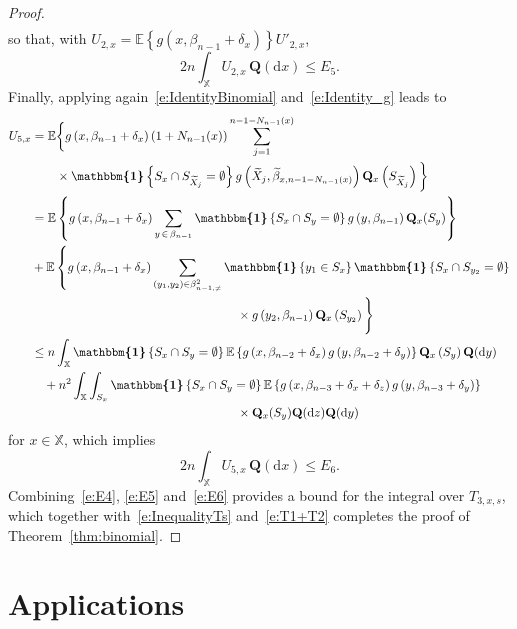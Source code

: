\documentclass[AHL,Unicode,longabstracts]{cedram}
\newcommand{\bQ}{\mathbf{Q}}
\newcommand*\X{\mathbb{X}}
\newcommand{\E}{\mathbb{E}}
\newcommand*\md{\mathrm{d}}
\newcommand{\mean}[1] {\E\left\{{#1}\right\}}
\newcommand{\ind}{\boldsymbol{\mathbbm{1}}}
\begin{document}
\begin{proof}
\begin{align*}
\end{align*}
so that, with $U_{2,x}=\mean{g(x,\beta_{n-1}+\delta_x)}U'_{2,x}$,
\begin{equation}\label{e:E5}
2 n\int_{\X} U_{2,x} \, \bQ(\md x) \leq E_5.
\end{equation}
Finally, applying again~\eqref{e:IdentityBinomial} and~\eqref{e:Identity_g} leads to
\begin{align*}
U_{5,x}
& = \E \bigg\{g\left(x,\beta_{n-1}+\delta_x\right) \left(1+N_{n-1}(x)\right) \sum_{j=1}^{n-1-N_{n-1}(x)}\\
&\qquad\times\ind\left\{S_x\cap S_{\widetilde{X}_j}=\emptyset\right\} g\left(\widetilde{X}_j,\widetilde{\beta}_{x,n-1-N_{n-1}(x)}\right) \bQ_x\left(S_{\widetilde{X}_j}\right) \bigg\} \\
& = \mean{ g\left(x,\beta_{n-1}+\delta_x\right) \sum_{y\,\in\,\beta_{n-1}} \ind\left\{S_x\cap S_y = \emptyset\right\} g\left(y,\beta_{n-1}\right) \bQ_x(S_y) } \\
& + \E\left\{ g\left(x,\beta_{n-1}+\delta_x\right) \sum_{\left(y_1,y_2\right)\in\beta_{n-1,\neq}^2} \ind\left\{y_1\in S_x\right\} \ind\left\{S_x\cap S_{y_2}=\emptyset\right\}\right.\\
&\mkern300mu \times g\left(y_2,\beta_{n-1}\right) \bQ_x\left(S_{y_2}\right)\Bigg\} \\
& \leq n \int_{\X} \ind\left\{S_x\cap S_y = \emptyset\right\} \mean{ g\left(x,\beta_{n-2}+\delta_x\right) g\left(y,\beta_{n-2}+\delta_y\right) } \bQ_x\left(S_y\right) \bQ(\md y) \\
& \quad + n^2 \int_{\X} \int_{S_x} \ind\left\{S_x\cap S_y = \emptyset\right\} \mean{g\left(x,\beta_{n-3}+\delta_x+\delta_z\right) g\left(y,\beta_{n-3}+\delta_y\right) } \\
&\mkern300mu\times\bQ_x(S_y) \bQ(\md z) \bQ(\md y) 
\end{align*}
for $x\in\X$, which implies
\begin{equation}\label{e:E6}
2n \int_{\X} U_{5,x} \, \bQ(\md x) \leq E_6.
\end{equation}
Combining~\eqref{e:E4}, \eqref{e:E5} and~\eqref{e:E6} provides a bound for the integral over $T_{3,x,s}$, which together with~\eqref{e:InequalityTs} and~\eqref{e:T1+T2} completes the proof of Theorem~\ref{thm:binomial}.
\end{proof}


\section{Applications}\label{sec:Applications}
\end{document}
